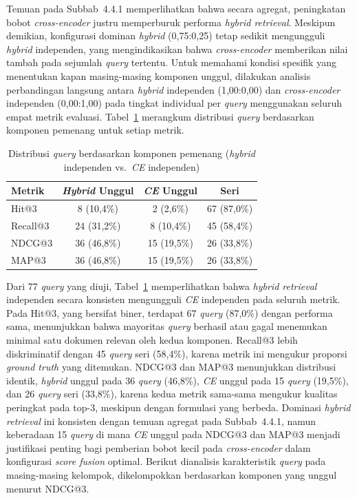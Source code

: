 Temuan pada Subbab~4.4.1 memperlihatkan bahwa secara agregat, peningkatan bobot \textit{cross-encoder} justru memperburuk performa \textit{hybrid retrieval}. Meskipun demikian, konfigurasi dominan \textit{hybrid} (0{,}75:0{,}25) tetap sedikit mengungguli \textit{hybrid} independen, yang mengindikasikan bahwa \textit{cross-encoder} memberikan nilai tambah pada sejumlah \textit{query} tertentu. Untuk memahami kondisi spesifik yang menentukan kapan masing-masing komponen unggul, dilakukan analisis perbandingan langsung antara \textit{hybrid} independen (1{,}00:0{,}00) dan \textit{cross-encoder} independen (0{,}00:1{,}00) pada tingkat individual per \textit{query} menggunakan seluruh empat metrik evaluasi. Tabel~\ref{tbl:433_winner_distribution} merangkum distribusi \textit{query} berdasarkan komponen pemenang untuk setiap metrik.

\begin{table}[H]
	\centering
	\caption{Distribusi \textit{query} berdasarkan komponen pemenang (\textit{hybrid} independen vs.\ \textit{CE} independen)}
	\label{tbl:433_winner_distribution}
	\small
	\begin{tabular}{lccc}
		\toprule
		Metrik & \textit{Hybrid} Unggul & \textit{CE} Unggul & Seri \\
		\midrule
		Hit@3 & 8 (10{,}4\%) & 2 (2{,}6\%) & 67 (87{,}0\%) \\
		Recall@3 & 24 (31{,}2\%) & 8 (10{,}4\%) & 45 (58{,}4\%) \\
		NDCG@3 & 36 (46{,}8\%) & 15 (19{,}5\%) & 26 (33{,}8\%) \\
		MAP@3 & 36 (46{,}8\%) & 15 (19{,}5\%) & 26 (33{,}8\%) \\
		\bottomrule
	\end{tabular}
\end{table}

Dari 77 \textit{query} yang diuji, Tabel~\ref{tbl:433_winner_distribution} memperlihatkan bahwa \textit{hybrid retrieval} independen secara konsisten mengungguli \textit{CE} independen pada seluruh metrik. Pada Hit@3, yang bersifat biner, terdapat 67 \textit{query} (87{,}0\%) dengan performa sama, menunjukkan bahwa mayoritas \textit{query} berhasil atau gagal menemukan minimal satu dokumen relevan oleh kedua komponen. Recall@3 lebih diskriminatif dengan 45 \textit{query} seri (58{,}4\%), karena metrik ini mengukur proporsi \textit{ground truth} yang ditemukan. NDCG@3 dan MAP@3 menunjukkan distribusi identik, \textit{hybrid} unggul pada 36 \textit{query} (46{,}8\%), \textit{CE} unggul pada 15 \textit{query} (19{,}5\%), dan 26 \textit{query} seri (33{,}8\%), karena kedua metrik sama-sama mengukur kualitas peringkat pada top-3, meskipun dengan formulasi yang berbeda. Dominasi \textit{hybrid retrieval} ini konsisten dengan temuan agregat pada Subbab~4.4.1, namun keberadaan 15 \textit{query} di mana \textit{CE} unggul pada NDCG@3 dan MAP@3 menjadi justifikasi penting bagi pemberian bobot kecil pada \textit{cross-encoder} dalam konfigurasi \textit{score fusion} optimal. Berikut dianalisis karakteristik \textit{query} pada masing-masing kelompok, dikelompokkan berdasarkan komponen yang unggul menurut NDCG@3.

